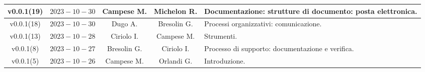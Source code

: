 {\begin{xltabular}{\textwidth}{c|c|c|c|X}
\hline
v0.0.1(19) & $2023-10-30$ & Campese M. & Michelon R. & Documentazione: strutture di documento: posta elettronica.\\
\hline
v0.0.1(18) & $2023-10-30$ & Dugo A. & Bresolin G. & Processi organizzativi: comunicazione.\\
\hline
v0.0.1(13) & $2023-10-28$ & Ciriolo I. & Campese M. & Strumenti.\\
\hline
v0.0.1(8) & $2023-10-27$ & Bresolin G. & Ciriolo I. & Processo di supporto: documentazione e verifica.\\
\hline
v0.0.1(5) & $2023-10-26$ & Campese M. & Orlandi G. &  Introduzione.\\

\end{xltabular}}